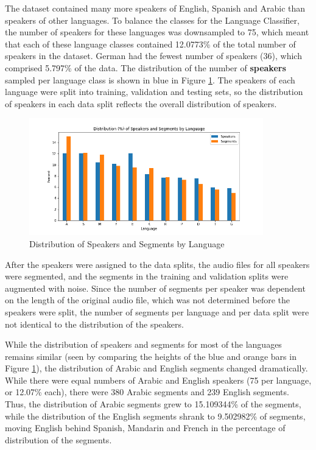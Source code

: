 \documentclass[11pt, letterpaper]{article}
\begin{document}
The dataset contained many more speakers of English, Spanish and Arabic than speakers of other languages. To balance the classes for the Language Classifier, the number of speakers for these languages was downsampled to 75, which meant that each of these language classes contained 12.0773\% of the total number of speakers in the dataset. German had the fewest number of speakers (36), which comprised 5.797\% of the data. The distribution of the number of \textbf{speakers} sampled per language class is shown in blue in Figure \ref{fig:LangDistTot}. The speakers of each language were split into training, validation and testing sets, so the distribution of speakers in each data split reflects the overall distribution of speakers.  %

\begin{figure}[h]
\begin{center}
\includegraphics[width=4in]{LangDistPercentSpSeg.png}
\caption{Distribution of Speakers and Segments by Language}
\label{fig:LangDistTot}
\end{center}
\end{figure}

After the speakers were assigned to the data splits, the audio files for all speakers were segmented, and the segments in the training and validation splits were augmented with noise. Since the number of segments per speaker was dependent on the length of the original audio file, which was not determined before the speakers were split, the number of segments per language and per data split were not identical to the distribution of the speakers. 

While the distribution of speakers and segments for most of the languages remains similar (seen by comparing the heights of the blue and orange bars in Figure \ref{fig:LangDistTot}), the distribution of Arabic and English segments changed dramatically. While there were equal numbers of Arabic and English speakers (75 per language, or 12.07\% each), there were 380 Arabic segments and 239 English segments. Thus, the distribution of Arabic segments grew to 15.109344\% of the segments, while the distribution of the English segments shrank to 9.502982\% of segments, moving English behind Spanish, Mandarin and French in the percentage of distribution of the segments.
\end{document}
